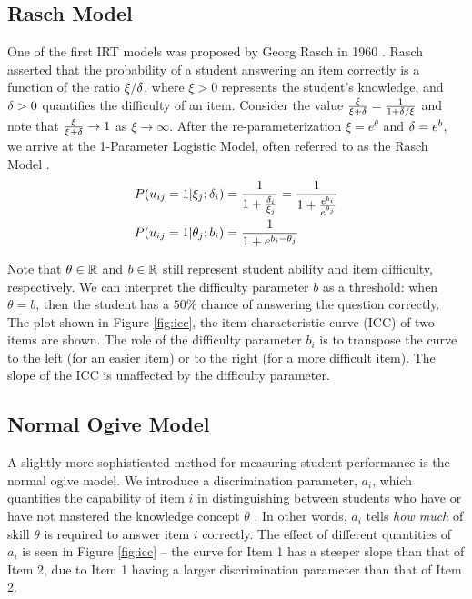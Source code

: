 \subsection{Rasch Model}
One of the first IRT models was proposed by Georg Rasch in 1960 \cite{rasch1960}. Rasch asserted that the probability of a student answering an item correctly is a function of the ratio $\xi / \delta$, where $\xi > 0$ represents the student's knowledge, and $\delta > 0$ quantifies the difficulty of an item. Consider the value $\frac{\xi}{\xi + \delta} = \frac{1}{1 + \delta / \xi}$ and note that $\frac{\xi}{\xi + \delta} \to 1$ as $\xi \to \infty$. After the re-parameterization $\xi = e^{\theta}$ and $\delta = e^{b}$, we arrive at the 1-Parameter Logistic Model, often referred to as the Rasch Model \cite{thissen}.
\begin{equation}
  \begin{split}
    P(u_{ij} = 1 | \xi_j; \delta_i) &= \frac{1}{1 + \frac{\delta_i}{\xi_j}} = \frac{1}{1 + \frac{e^{b_i}}{e^{\theta_j}}} \\
  P(u_{ij} = 1 | \theta_j; b_i) &= \frac{1}{1 + e^{b_i - \theta_j}} 
  \end{split}
  \label{eq:rasch}
\end{equation}

Note that $\theta \in \mathbb{R}$ and $b \in \mathbb{R}$ still represent student ability and item difficulty, respectively. We can interpret the difficulty parameter $b$ as a threshold: when $\theta = b$, then the student has a $50\%$ chance of answering the question correctly. The plot shown in Figure \ref{fig:icc}, the item characteristic curve (ICC) of two items are shown. The role of the difficulty parameter $b_i$ is to transpose the curve to the left (for an easier item) or to the right (for a more difficult item). The slope of the ICC is unaffected by the difficulty parameter.


\subsection{Normal Ogive Model}\label{sec:ogive}
A slightly more sophisticated method for measuring student performance is the normal ogive model. We introduce a discrimination parameter, $a_i$, which quantifies the capability of item $i$ in distinguishing between students who have or have not mastered the knowledge concept $\theta$ \cite{thissen}. In other words, $a_i$ tells \textit{how much} of skill $\theta$ is required to answer item $i$ correctly. The effect of different quantities of $a_i$ is seen in Figure \ref{fig:icc} -- the curve for Item 1 has a steeper slope than that of Item 2, due to Item 1 having a larger discrimination parameter than that of Item 2.

